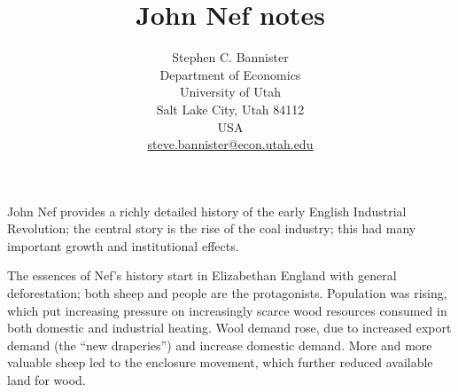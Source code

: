 \documentclass[11pt]{article}
\title{John Nef notes} %
\author{Stephen C. Bannister\\
	Department of Economics\\
	University of Utah\\
	Salt Lake City, Utah 84112\\
	USA\\
	\href{mailto:steve.bannister@econ.utah.edu}{steve.bannister@econ.utah.edu}\\
	}
\date{}
\begin{document}

	\maketitle
	\nocite{*}

John Nef provides a richly detailed history of the early English Industrial Revolution; the central story is the rise of the coal industry; this had many important growth and institutional effects.


The essences of Nef's history start in Elizabethan England with general deforestation; both sheep and people are the protagonists. Population was rising, which put increasing pressure on increasingly scarce wood resources consumed in both domestic and industrial heating. Wool demand rose, due to increased export demand (the ``new draperies'') and increase domestic demand. More and more valuable sheep led to the enclosure movement, which further reduced available land for wood.
\end{document}
